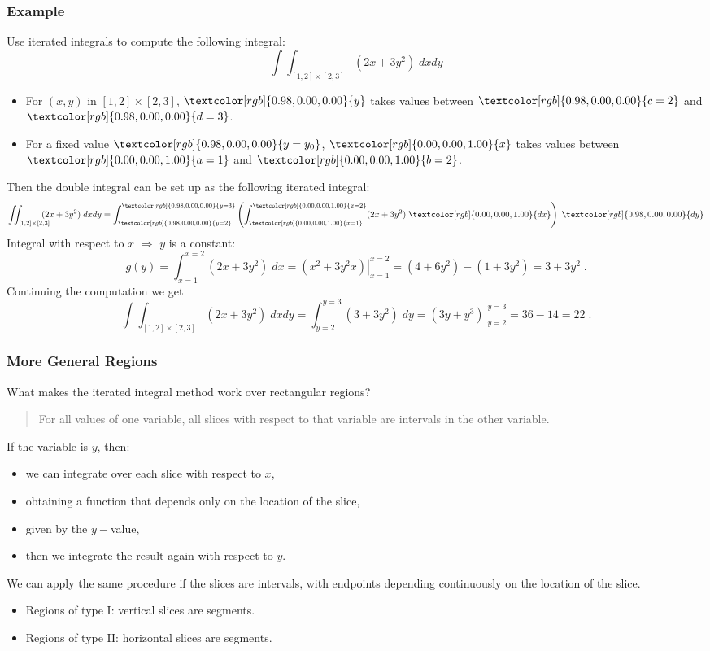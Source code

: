 \begin{frame}
  \frametitle{Example}

Use iterated integrals to compute the following integral:
%
$$\int\!\!\!\int_{[1,2]\times [2,3]}\!\!\!\!\!\! (2x+3y^2) \; dxdy$$
%
\begin{itemize}
  \item \pause For $(x,y)$ in $[1,2]\times [2,3]$, $\textcolor[rgb]{0.98,0.00,0.00}{y}$ takes values \pause between $\textcolor[rgb]{0.98,0.00,0.00}{c=2}$ and $\textcolor[rgb]{0.98,0.00,0.00}{d=3}$.
  \item \pause For a fixed value $\textcolor[rgb]{0.98,0.00,0.00}{y=y_0}$, $\textcolor[rgb]{0.00,0.00,1.00}{x}$ takes values \pause between $\textcolor[rgb]{0.00,0.00,1.00}{a=1}$ and $\textcolor[rgb]{0.00,0.00,1.00}{b=2}$.
\end{itemize}
\pause
Then the double integral can be set up as the following iterated integral:
%
$$\int\!\!\!\int_{[1,2]\times [2,3]}\!\!\!\!\!\! (2x+3y^2) \; dxdy = \int_{\textcolor[rgb]{0.98,0.00,0.00}{y=2}}^{\textcolor[rgb]{0.98,0.00,0.00}{y=3}} \left( \int_{\textcolor[rgb]{0.00,0.00,1.00}{x=1}}^{\textcolor[rgb]{0.00,0.00,1.00}{x=2}} (2x+3y^2) \; \textcolor[rgb]{0.00,0.00,1.00}{dx} \right) \; \textcolor[rgb]{0.98,0.00,0.00}{dy} $$
\pause
Integral with respect to $x$ \pause $\Longrightarrow$ $y$ is a constant:
%
$$g(y) = \int_{x=1}^{x=2} (2x+3y^2) \; dx = \left. (x^2+3y^2x) \right|_{x=1}^{x=2} = (4+6y^2)-(1+3y^2) = 3+3y^2\; .$$
%
\pause Continuing the computation we get\pause
%
$$\int\!\!\!\int_{[1,2]\times [2,3]}\!\!\!\!\!\! (2x+3y^2) \; dxdy = \int_{y=2}^{y=3} (3+3y^2)\; dy = \left. (3y+y^3) \right|_{y=2}^{y=3} = 36-14=22\; .$$
\end{frame}

\begin{frame}
  \frametitle{More General Regions}

  What makes the iterated integral method work over rectangular regions?\pause

\begin{quote}
  For all values of one variable, all slices with respect to that variable are intervals in the other variable.
\end{quote}
\pause
If the variable is $y$, then:
\begin{itemize}
  \item we can integrate over each slice with respect to $x$,
  \item obtaining a function that depends only on the location of the slice,
  \item given by the $y-$value,
  \item then we integrate the result again with respect to $y$.
\end{itemize}
\pause
We can apply the same procedure if the slices are intervals, with endpoints depending continuously on the location of the slice.\pause
%
\begin{itemize}
  \item Regions of type I: vertical slices are segments.
  \item Regions of type II: horizontal slices are segments.
\end{itemize}
\end{frame}

